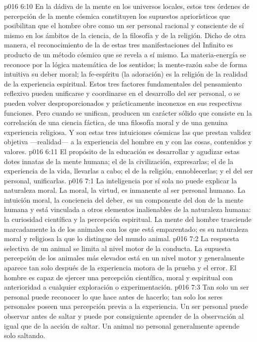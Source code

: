 \vs p016 6:10 \pc En la dádiva de la mente en los universos locales, estos tres órdenes de percepción de la mente cósmica constituyen los supuestos apriorísticos que posibilitan que el hombre obre como un ser personal racional y consciente de sí mismo en los ámbitos de la ciencia, de la filosofía y de la religión. Dicho de otra manera, el reconocimiento de la  de estas tres manifestaciones del Infinito es producto de un método cósmico que se revela a sí mismo. La materia\hyp{}energía se reconoce por la lógica matemática de los sentidos; la mente\hyp{}razón sabe de forma intuitiva su deber moral; la fe\hyp{}espíritu (la adoración) es la religión de la realidad de la experiencia espiritual. Estos tres factores fundamentales del pensamiento reflexivo pueden unificarse y coordinarse en el desarrollo del ser personal, o se pueden volver desproporcionados y prácticamente inconexos en sus respectivas funciones. Pero cuando se unifican, producen un carácter sólido que consiste en la correlación de una ciencia fáctica, de una filosofía moral y de una genuina experiencia religiosa. Y son estas tres intuiciones cósmicas las que prestan validez objetiva ---realidad--- a la experiencia del hombre en y con las cosas, contenidos y valores.
\vs p016 6:11 El propósito de la educación es desarrollar y agudizar estas dotes innatas de la mente humana; el de la civilización, expresarlas; el de la experiencia de la vida, llevarlas a cabo; el de la religión, ennoblecerlas; y el del ser personal, unificarlas.
\vs p016 7:1 La inteligencia por sí sola no puede explicar la naturaleza moral. La moral, la virtud, es inmanente al ser personal humano. La intuición moral, la conciencia del deber, es un componente del don de la mente humana y está vinculada a otros elementos inalienables de la naturaleza humana: la curiosidad científica y la percepción espiritual. La mente del hombre trasciende marcadamente la de los animales con los que está emparentado; es su naturaleza moral y religiosa la que lo distingue del mundo animal.
\vs p016 7:2 La respuesta selectiva de un animal se limita al nivel motor de la conducta. La supuesta percepción de los animales más elevados está en un nivel motor y generalmente aparece tan solo después de la experiencia motora de la prueba y el error. El hombre es capaz de ejercer una percepción científica, moral y espiritual con anterioridad a cualquier exploración o experimentación.
\vs p016 7:3 Tan solo un ser personal puede reconocer lo que hace antes de hacerlo; tan solo los seres personales poseen una percepción previa a la experiencia. Un ser personal puede observar antes de saltar y puede por consiguiente aprender de la observación al igual que de la acción de saltar. Un animal no personal generalmente aprende solo saltando.
